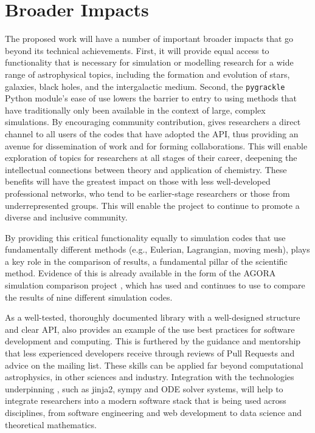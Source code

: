\section{Broader Impacts}

The proposed work will have a number of important broader impacts that go
beyond its technical achievements.  First, it will provide equal
access to functionality that is necessary for simulation or modelling
research for a wide range of astrophysical topics, including the
formation and evolution of stars, galaxies, black holes, and the
intergalactic medium.
Second, the \texttt{pygrackle} Python module's ease of use lowers the
barrier to entry to using methods that have traditionally only been
available in the context of large, complex simulations.  By
encouraging community contribution, \grackle{} gives researchers
a direct channel to all users of the codes that have adopted the
\grackle{} API, thus providing an avenue for dissemination of
work and for forming collaborations.  This will enable exploration of topics
for researchers at all stages of their career, deepening the intellectual connections between
theory and application of chemistry.  These benefits will have the
greatest impact on those with less well-developed professional
networks, who tend to be earlier-stage researchers or those from
underrepresented groups.  This will enable the \grackle{} project
to continue to promote a diverse and inclusive community.

By providing this critical functionality equally to simulation codes
that use fundamentally different methods (e.g., Eulerian, Lagrangian,
moving mesh), \grackle{} plays a key role in the comparison of
results, a fundamental pillar of the scientific method.  Evidence of
this is already available in the form of the AGORA simulation
comparison project \citep{2014ApJS..210...14K, 2016ApJ...833..202K},
which has used and continues to use \grackle{} to compare the results
of nine
different simulation codes.

As a well-tested, thoroughly documented library with a well-designed
structure and clear API, \grackle{} also provides an example of the
use best practices for software development and computing.  This is
furthered by the guidance and mentorship that less experienced
developers receive through reviews of Pull Requests and
advice on the mailing list.  These skills can be applied far
beyond computational astrophysics, in other sciences and industry.  Integration
with the technologies underpinning \dengo{}, such as jinja2, sympy and ODE
solver systems, will help to integrate researchers into a modern software stack
that is being used across disciplines, from software engineering and web
development to data science and theoretical mathematics.
